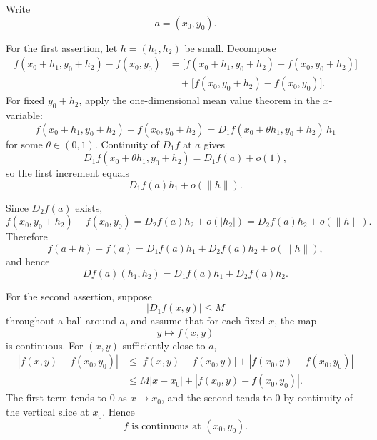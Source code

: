\begin{solution}
Write
\[
a=(x_0,y_0).
\]

For the first assertion, let \(h=(h_1,h_2)\) be small. Decompose
\[
\begin{aligned}
f(x_0+h_1,y_0+h_2)-f(x_0,y_0)
&=
\bigl[
f(x_0+h_1,y_0+h_2)-f(x_0,y_0+h_2)
\bigr]\\
&\quad+
\bigl[
f(x_0,y_0+h_2)-f(x_0,y_0)
\bigr].
\end{aligned}
\]
For fixed \(y_0+h_2\), apply the one-dimensional mean value theorem in the \(x\)-variable:
\[
f(x_0+h_1,y_0+h_2)-f(x_0,y_0+h_2)
=
D_1f(x_0+\theta h_1,y_0+h_2)\,h_1
\]
for some \(\theta\in(0,1)\). Continuity of \(D_1f\) at \(a\) gives
\[
D_1f(x_0+\theta h_1,y_0+h_2)
=
D_1f(a)+o(1),
\]
so the first increment equals
\[
D_1f(a)h_1+o(\|h\|).
\]

Since \(D_2f(a)\) exists,
\[
f(x_0,y_0+h_2)-f(x_0,y_0)
=
D_2f(a)h_2+o(|h_2|)
=
D_2f(a)h_2+o(\|h\|).
\]
Therefore
\[
f(a+h)-f(a)
=
D_1f(a)h_1+D_2f(a)h_2+o(\|h\|),
\]
and hence
\[
\boxed{
Df(a)(h_1,h_2)
=
D_1f(a)h_1+D_2f(a)h_2.
}
\]

For the second assertion, suppose
\[
|D_1f(x,y)|\le M
\]
throughout a ball around \(a\), and assume that for each fixed \(x\), the map
\[
y\longmapsto f(x,y)
\]
is continuous. For \((x,y)\) sufficiently close to \(a\),
\[
\begin{aligned}
|f(x,y)-f(x_0,y_0)|
&\le
|f(x,y)-f(x_0,y)|
+
|f(x_0,y)-f(x_0,y_0)|\\
&\le
M|x-x_0|
+
|f(x_0,y)-f(x_0,y_0)|.
\end{aligned}
\]
The first term tends to \(0\) as \(x\to x_0\), and the second tends to \(0\) by continuity
of the vertical slice at \(x_0\). Hence
\[
\boxed{f\text{ is continuous at }(x_0,y_0).}
\]
\end{solution}



